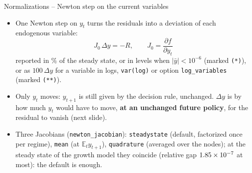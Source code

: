 \documentclass[11pt,aspectratio=169]{beamer}
\newcommand{\E}{\mathbb{E}}
\newcommand{\code}[1]{\texttt{#1}}
\begin{document}
\begin{frame}{Normalizations -- Newton step on the current variables}

\begin{itemize}

\item One Newton step on $y_t$ turns the residuals into a deviation of each endogenous variable:
  \[
  \boxed{J_0\,\Delta y = -R,\qquad J_0 = \frac{\partial f}{\partial y_t}}
  \]
  reported in \% of the steady state, or in levels when $|\bar y|<10^{-6}$ (marked \code{(*)}), or as $100\,\Delta y$ for a variable in logs, \code{var(log)} or option \code{log\_variables} (marked \code{(**)}).\newline

\item Only $y_t$ moves: $y_{t+1}$ is still given by the decision rule, unchanged. $\Delta y$ is by how much $y_t$ would have to move, \textbf{at an unchanged future policy}, for the residual to vanish (next slide).\newline

\item Three Jacobians (\code{newton\_jacobian}): \code{steadystate} (default, factorized once per regime), \code{mean} (at $\E_t y_{t+1}$), \code{quadrature} (averaged over the nodes); at the steady state of the growth model they coincide (relative gap $1.85\times10^{-7}$ at most): the default is enough.

\end{itemize}

\end{frame}
\end{document}

